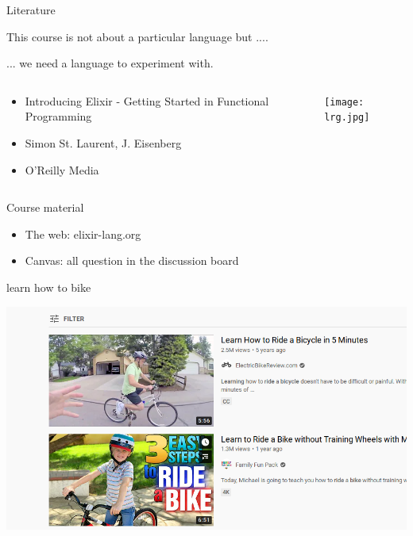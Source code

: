 \begin{frame}{Literature}

  This course is not about a particular language but .... \pause

  \vspace{20pt}\hspace{40pt} ... we need a language to experiment with.

\pause
\begin{columns}
 \begin{column}{0.6\linewidth}
   \begin{itemize}
   \item Introducing Elixir - Getting Started in Functional Programming
   \item Simon St. Laurent, J. Eisenberg
   \item O'Reilly Media
   \end{itemize}
 \end{column}
 \begin{column}{0.4\linewidth}
    \texttt{[image: lrg.jpg]}
 \end{column}
\end{columns}

\end{frame}

\begin{frame}{Course material}

  \begin{itemize}
   \item The web:  elixir-lang.org
   \item Canvas: all question in the discussion board
  \end{itemize}  

\end{frame}

\begin{frame}{learn how to bike}

  \pause
  \includegraphics[scale=0.6]{learn.png} 

\end{frame}

